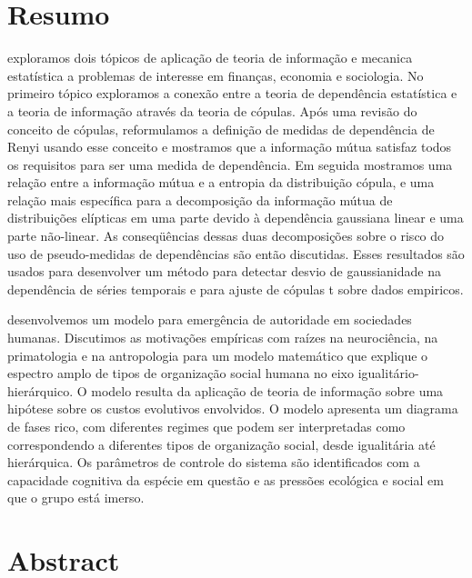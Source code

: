 \chapter*{Resumo}
 exploramos dois tópicos de aplicação de teoria de informação e mecanica estatística a problemas de interesse em finanças, economia e sociologia. No primeiro tópico exploramos a conexão entre a teoria de dependência estatística e a teoria de informação através da teoria de cópulas. Após uma revisão do conceito de cópulas, reformulamos a definição de medidas de dependência de Renyi\citep{Renyi1959} usando esse conceito e mostramos que a informação mútua satisfaz todos os requisitos para ser uma medida de dependência. Em seguida mostramos uma relação entre a informação mútua e a entropia da distribuição cópula, e uma relação mais específica para a decomposição da informação mútua de distribuições elípticas em uma parte devido à dependência gaussiana linear e uma parte não-linear. As conseqüências dessas duas decomposições sobre o risco do uso de pseudo-medidas de dependências são então discutidas. Esses resultados são usados para desenvolver um método para detectar desvio de gaussianidade na dependência de séries temporais e para ajuste de cópulas t sobre dados empiricos\citep{Calsaverini2009}.

 desenvolvemos um modelo para emergência de autoridade em sociedades humanas. Discutimos as motivações empíricas com raízes na neurociência, na primatologia e na antropologia para um modelo matemático que explique o espectro amplo de tipos de organização social humana no eixo igualitário-hierárquico. O modelo resulta da aplicação de teoria de informação sobre uma hipótese sobre os custos evolutivos envolvidos. O modelo apresenta um diagrama de fases rico, com diferentes regimes que podem ser interpretadas como correspondendo a diferentes tipos de organização social, desde igualitária até hierárquica. Os parâmetros de controle do sistema são identificados com a capacidade cognitiva da espécie em questão e as pressões ecológica e social em que o grupo está imerso.

\chapter*{Abstract}
 
